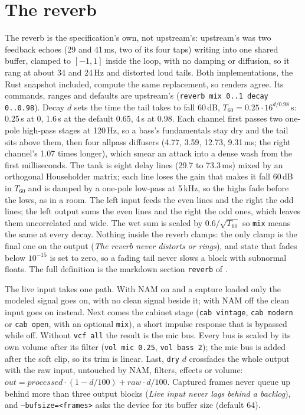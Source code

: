 \documentclass[11pt,oneside]{book}
\newcommand{\cmd}[1]{\texttt{#1}}
\begin{document}
\section{The reverb}\label{sec:reverb}
The reverb is the specification's own, not upstream's: upstream's was two
feedback echoes (29 and 41\,ms, two of its four taps) writing into one shared
buffer, clamped to $[-1,1]$ inside the loop, with no damping or diffusion, so it
rang at about 34 and 24\,Hz and distorted loud tails. Both implementations,
the Rust snapshot included, compute the same replacement, so renders agree. Its commands, ranges
and defaults are upstream's (\cmd{reverb mix 0..1 decay 0..0.98}). Decay $d$
sets the time the tail takes to fall 60\,dB, $T_{60} = 0.25 \cdot 16^{d/0.98}$\,s:
0.25\,s at 0, 1.6\,s at the default 0.65, 4\,s at 0.98. Each channel first
passes two one-pole high-pass stages at 120\,Hz, so a bass's fundamentals stay
dry and the tail sits above them, then four allpass diffusers (4.77, 3.59,
12.73, 9.31\,ms; the right channel's 1.07 times longer), which smear an attack
into a dense wash from the first milliseconds. The tank is eight delay lines
(29.7 to 73.3\,ms) mixed by an orthogonal Householder matrix; each line loses
the gain that makes it fall 60\,dB in $T_{60}$ and is damped by a one-pole
low-pass at 5\,kHz, so the highs fade before the lows, as in a room. The left
input feeds the even lines and the right the odd lines; the left output sums
the even lines and the right the odd ones, which leaves them uncorrelated and
wide. The wet sum is scaled by $0.6/\sqrt{T_{60}}$ so \cmd{mix} means the same
at every decay. Nothing inside the reverb clamps: the only clamp is the final
one on the output (\emph{The reverb never distorts or rings}), and state that
fades below $10^{-15}$ is set to zero, so a fading tail never slows a block
with subnormal floats. The full definition is the markdown section
\texttt{reverb} of .

The live input takes one path. With NAM on and a capture loaded only the
modeled signal goes on, with no clean signal beside it; with NAM off the clean
input goes on instead. Next comes the cabinet stage (\cmd{cab vintage},
\cmd{cab modern} or \cmd{cab open}, with an optional \cmd{mix}), a short
impulse response that is bypassed while off. Without \cmd{vcf all} the result
is the mic bus. Every bus is scaled by its own volume after its filter
(\cmd{vol mic 0.25}, \cmd{vol bass 2}); the mic bus is added after the soft
clip, so its trim is linear. Last, \cmd{dry} $d$ crossfades the whole
output with the raw input, untouched by NAM, filters, effects or volume:
$\mathit{out} = \mathit{processed}\cdot(1-d/100) + \mathit{raw}\cdot d/100$.
Captured frames never queue up behind more than three output blocks
(\emph{Live input never lags behind a backlog}), and \cmd{--bufsize=<frames>}
asks the device for its buffer size (default 64).
\end{document}
